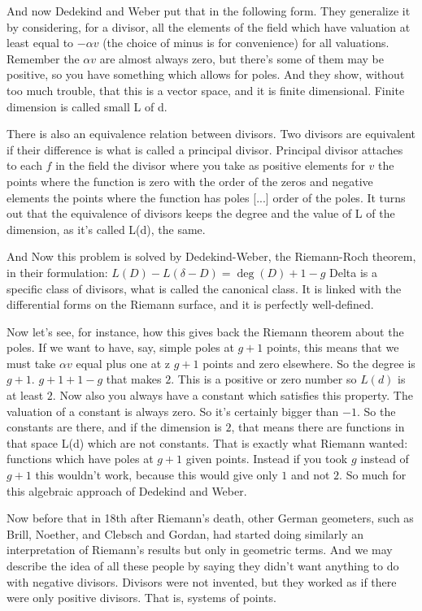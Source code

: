 \documentclass{article}
\begin{document}
And now Dedekind and Weber put that in the following form.
They generalize it by considering, 
for a divisor,
all the elements of the field 
which have valuation at least equal to $-\alpha v$
(the choice of minus is for convenience)
for all valuations.
Remember the $\alpha v$ are almost always zero,
but there's some of them may be positive,
so you have something which allows for poles.
And they show, without too much trouble, that this is a vector space,
and it is finite dimensional.
Finite dimension is called small L of d.

There is also an equivalence relation between divisors.
Two divisors are equivalent 
if their difference is what is called a principal divisor.
Principal divisor attaches to each $f$ in the field 
the divisor where you take as positive elements for $v$ 
the points where the function is zero
with the order of the zeros
and negative elements the points 
where the function has poles [...] order of the poles.
It turns out that the equivalence of divisors 
keeps the degree and the value of L of the dimension, 
as it's called L(d), the same.

And Now this problem is solved by Dedekind-Weber, 
the Riemann-Roch theorem, in their formulation:
$L(D)-L(\delta-D)=\deg(D)+1-g$
Delta is a specific class of divisors, 
what is called the canonical class.
It is linked with the differential forms on the Riemann surface, 
and it is perfectly well-defined.

Now let's see, for instance, 
how this gives back the Riemann theorem about the poles.
If we want to have, say, simple poles at $g+1$ points,
this means that we must take $\alpha v$ equal plus one 
at z $g+1$ points and zero elsewhere.
So the degree is $g+1$.
$g+1 +1 - g$  that makes $2$.
This is a positive or zero number so $L(d)$ is at least $2$.
Now also you always have a constant which satisfies this property.
The valuation of a constant is always zero.
So it's certainly bigger than $-1$.
So the constants are there, and if the dimension is $2$,
that means there are functions in that space L(d) 
which are not constants.
That is exactly what Riemann wanted: 
functions which have poles at $g+1$ given points.
Instead if you took $g$ instead of $g+1$ this wouldn't work,
because this would give only $1$ and not $2$.
So much for this algebraic approach of Dedekind and Weber.

Now before that in 18th after Riemann's death,
other German geometers, 
such as Brill, Noether, and Clebsch and Gordan, 
had started doing similarly an interpretation of Riemann's results
but only in geometric terms.
And we may describe the idea of all these people
by saying they didn't want anything to do with negative divisors.
Divisors were not invented,
but they worked as if there were only positive divisors.
That is, systems of points.
\end{document}
